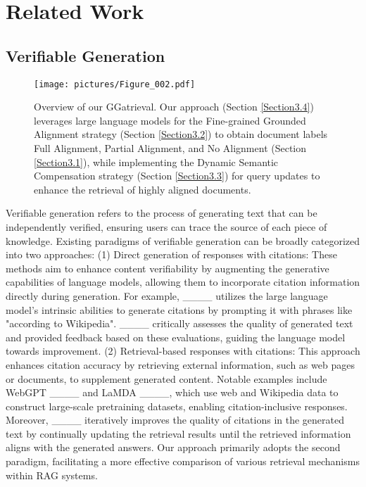 \section{Related Work}
\subsection{Verifiable Generation}

\begin{figure*}[t]
  \centering %
  \texttt{[image: pictures/Figure\_002.pdf]} %
  \caption{Overview of our GGatrieval. Our approach (Section \ref{Section3.4}) leverages large language models for the Fine-grained Grounded Alignment strategy (Section \ref{Section3.2}) to obtain document labels {Full Alignment, Partial Alignment, and No Alignment} (Section \ref{Section3.1}), while implementing the Dynamic Semantic Compensation strategy (Section \ref{Section3.3}) for query updates to enhance the retrieval of highly aligned documents.}
  \label{fig:figure_2} %
\end{figure*}

Verifiable generation refers to the process of generating text that can be independently verified, ensuring users can trace the source of each piece of knowledge. Existing paradigms of verifiable generation can be broadly categorized into two approaches: (1) Direct generation of responses with citations: These methods aim to enhance content verifiability by augmenting the generative capabilities of language models, allowing them to incorporate citation information directly during generation. For example, ____ utilizes the large language model's intrinsic abilities to generate citations by prompting it with phrases like "according to Wikipedia". ____ critically assesses the quality of generated text and provided feedback based on these evaluations, guiding the language model towards improvement. (2) Retrieval-based responses with citations: This approach enhances citation accuracy by retrieving external information, such as web pages or documents, to supplement generated content. Notable examples include WebGPT ____ and LaMDA ____, which use web and Wikipedia data to construct large-scale pretraining datasets, enabling citation-inclusive responses. Moreover, ____ iteratively improves the quality of citations in the generated text by continually updating the retrieval results until the retrieved information aligns with the generated answers. Our approach primarily adopts the second paradigm, facilitating a more effective comparison of various retrieval mechanisms within RAG systems.

